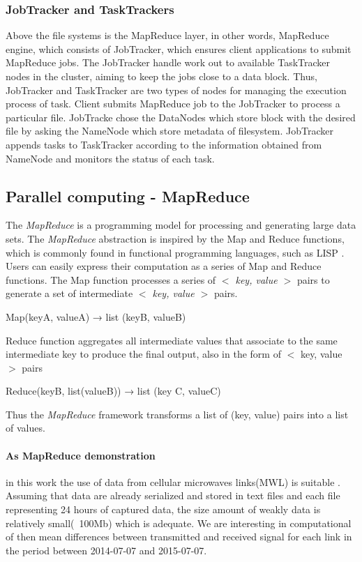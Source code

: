 \documentclass[a4paper,12pt,oneside]{report}
\begin{document}
\subsubsection{JobTracker and TaskTrackers}
Above the file systems is  the MapReduce layer, in other words, MapReduce engine, which consists of 
JobTracker,  which ensures client applications to submit MapReduce jobs. The JobTracker handle work 
out to available TaskTracker nodes in the cluster, 
aiming to keep the jobs close to a data block.  Thus, JobTracker and TaskTracker are two types of 
nodes for managing the execution process of  task.
Client submits MapReduce job  to the JobTracker to process a particular file. JobTracke chose the 
DataNodes which store block with the desired file by asking the NameNode which store metadata of filesystem. 
JobTracker appends tasks to TaskTracker according to the  information obtained from NameNode and monitors the status of each task.


	\subsection{Parallel computing - MapReduce}		
The \emph{MapReduce} is a programming model for processing and generating large data
sets. The \emph{MapReduce} abstraction is inspired by the Map and Reduce functions, which is commonly
found in functional programming languages, such as LISP \cite{lisp}. Users can easily express their
computation as a series of Map and Reduce functions. The Map function processes a series of
\textit{$<$ key, value $>$} pairs to generate a set of intermediate \textit{$<$ key, value $>$} pairs.

\begin{center}
Map(keyA, valueA) → list (keyB, valueB)
\end{center}
Reduce function aggregates all intermediate values that associate to the same intermediate key
to produce the final output, also in the form of $<$ key, value $>$ pairs
\begin{center}
Reduce(keyB, list(valueB)) → list (key C, valueC)
\end{center}
Thus the \emph{MapReduce} framework transforms a list of (key, value) pairs into a list of values. 


\paragraph{As MapReduce demonstration} in this work the use of data from cellular microwaves links(MWL)  is suitable . 
Assuming that data are already serialized and stored in text files and each file representing 24 hours 
of captured data, the size amount of weakly data is relatively small(~100Mb) which is adequate.
We are interesting in computational of then  mean differences between transmitted and received signal for 
each link in the period between 2014-07-07 and 2015-07-07.
\end{document}
